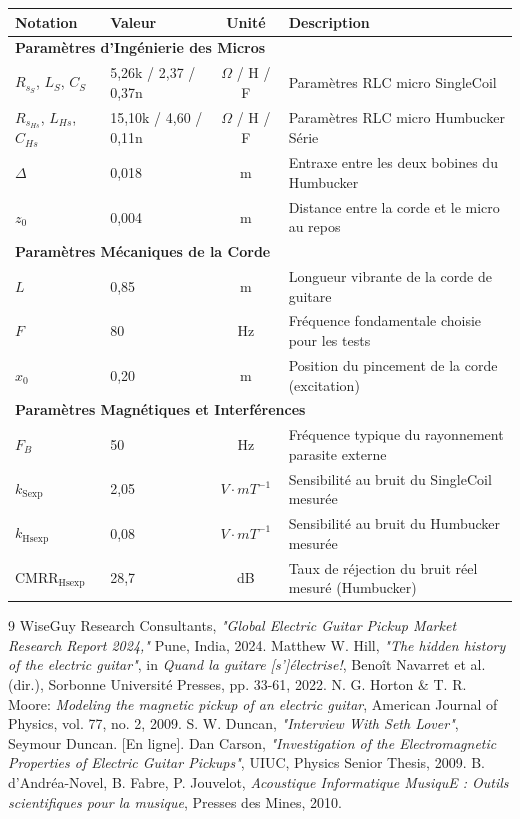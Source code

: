 \documentclass[11pt, a4paper]{article}
\begin{document}
\begin{center}
\small
\begin{tabularx}{\textwidth}{llcX}
\toprule
\textbf{Notation} & \textbf{Valeur} & \textbf{Unité} & \textbf{Description} \\
\midrule
\multicolumn{4}{l}{\textbf{Paramètres d'Ingénierie des Micros}} \\
\midrule
$R_{s_S}$, $L_S$, $C_S$ & 5,26k / 2,37 / 0,37n & $\Omega$ / H / F & Paramètres RLC micro SingleCoil \\
$R_{s_{Hs}}$, $L_{Hs}$, $C_{Hs}$ & 15,10k / 4,60 / 0,11n & $\Omega$ / H / F & Paramètres RLC micro Humbucker Série \\
$\Delta$ & 0,018 & m & Entraxe entre les deux bobines du Humbucker \\
$z_{0}$ & 0,004 & m & Distance entre la corde et le micro au repos \\
\midrule
\multicolumn{4}{l}{\textbf{Paramètres Mécaniques de la Corde}} \\
\midrule
$L$ & 0,85 & m & Longueur vibrante de la corde de guitare \\
$F$ & 80 & Hz & Fréquence fondamentale choisie pour les tests \\
$x_{0}$ & 0,20 & m & Position du pincement de la corde (excitation) \\
\midrule
\multicolumn{4}{l}{\textbf{Paramètres Magnétiques et Interférences}} \\
\midrule
$F_{B}$ & 50 & Hz & Fréquence typique du rayonnement parasite externe \\
$k_{\text{Sexp}}$ & 2,05 & $V\cdot mT^{-1}$ & Sensibilité au bruit du SingleCoil mesurée \\
$k_{\text{Hsexp}}$ & 0,08 & $V\cdot mT^{-1}$ & Sensibilité au bruit du Humbucker mesurée \\
$\text{CMRR}_{\text{Hsexp}}$ & 28,7 & dB & Taux de réjection du bruit réel mesuré (Humbucker) \\
\bottomrule
\end{tabularx}
\end{center}

\begin{thebibliography}{9}
 WiseGuy Research Consultants, \textit{"Global Electric Guitar Pickup Market Research Report 2024,"} Pune, India, 2024.
 Matthew W. Hill, \textit{"The hidden history of the electric guitar"}, in \textit{Quand la guitare [s']électrise!}, Benoît Navarret et al. (dir.), Sorbonne Université Presses, pp. 33-61, 2022.
 N. G. Horton \& T. R. Moore: \textit{Modeling the magnetic pickup of an electric guitar}, American Journal of Physics, vol. 77, no. 2, 2009.
 S. W. Duncan, \textit{"Interview With Seth Lover"}, Seymour Duncan. [En ligne].
 Dan Carson, \textit{"Investigation of the Electromagnetic Properties of Electric Guitar Pickups"}, UIUC, Physics Senior Thesis, 2009.
 B. d'Andréa-Novel, B. Fabre, P. Jouvelot, \textit{Acoustique Informatique MusiquE : Outils scientifiques pour la musique}, Presses des Mines, 2010.
\end{thebibliography}
\end{document}
